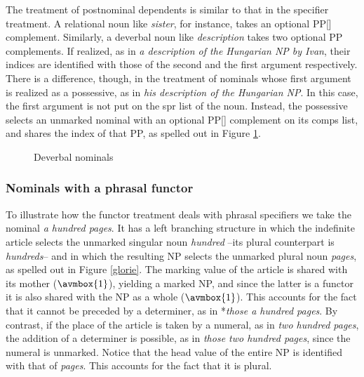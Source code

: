 \documentclass[output=paper]{langsci/langscibook}
\begin{document}
The treatment of postnominal dependents is similar to that in the specifier treatment. 
A relational noun like \emph{sister}, for instance, takes an optional PP[] complement.  
Similarly, a deverbal noun like \emph{description} takes two optional PP complements. 
If realized, as in \emph{a description of the Hungarian NP by Ivan}, 
their indices are identified with those of the second and the first argument respectively. 
There is a difference, though, in the treatment of nominals 
whose first argument is realized as a possessive, as in 
\emph{his description of the Hungarian NP}. In this case, the first argument is not put on the 
{\sc spr} list of the noun. Instead, the possessive selects an unmarked nominal with an optional 
PP[] complement on its {\sc comps} list, and shares the index of that PP, 
as spelled out in Figure \ref{possy}. 

\begin{figure}
	\centering
{}
	\caption{\label{possy} Deverbal nominals }
\end{figure}


        
\subsubsection{Nominals with a phrasal functor} 
\label{sec-phrasal-spec}


To illustrate how the functor treatment deals with phrasal specifiers we 
take the nominal \emph{a hundred pages}. It has a left branching structure in
which the indefinite article selects the unmarked singular noun \emph{hundred} --its plural 
counterpart is \emph{hundreds}--  
and in which the resulting NP selects the unmarked plural noun 
\emph{pages}, as spelled out in Figure \ref{glorie}. The  
{\sc marking} value of the article is shared with its mother ($\avmbox{1}$), 
yielding a marked NP, and since the latter is a functor it is also shared with 
the NP as a whole ($\avmbox{1}$). 
This accounts for the fact that it cannot be preceded by a determiner, 
as in *\emph{those a hundred pages}. By contrast, if the place of the article is taken 
by a numeral, as in \emph{two hundred pages}, the addition of a determiner is 
possible, as in \emph{those two hundred pages}, since the numeral is unmarked. 
Notice that the {\sc head} value of the entire NP is identified with that 
of \emph{pages}. This accounts for the fact that it is plural.  
 
\end{document}
